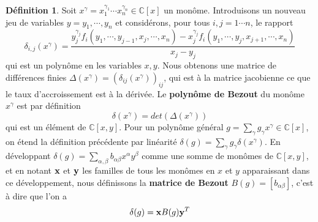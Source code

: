 \documentclass{article}
\theoremstyle{plain}%
\theoremstyle{definition}
\newtheorem{defn}{Définition}
\theoremstyle{remark}
\newcommand{\C}{\mathbb{C}}
\begin{document}
\begin{defn}
Soit $x^\gamma = x_1^{\gamma_1}\cdots x_n^{\gamma_n} \in \C[x]$ un monôme.
Introduisons un nouveau jeu de variables $y = y_1,\cdots, y_n$ et considérons, pour tous $i, j = 1\cdots n$, le rapport
\begin{equation}
\label{finite_diff}
\delta_{i,j}(x^\gamma) = \dfrac{y_j^{\gamma_j}f_i(y_1,\cdots, y_{j-1},x_j,\cdots,x_n) - x_j^{\gamma_j}f_i(y_1,\cdots,y_j,x_{j+1},\cdots,x_n)}{x_j - y_j}
\end{equation}
qui est un polynôme en les variables $x, y$. Nous obtenons une matrice de différences finies $\Delta(x^\gamma) = (\delta_{ij}(x^\gamma))_{ij}$, qui est à la matrice jacobienne ce que le taux d'accroissement est à la dérivée.
Le {\bf polynôme de Bezout} du monôme $x^\gamma$ est par définition
\begin{equation}
	\delta(x^\gamma) = det(\Delta(x^\gamma))
\end{equation}
qui est un élément de $\C[x, y]$. Pour un polynôme général $g = \sum_\gamma g_\gamma x^\gamma \in \C[x]$, on étend la définition précédente par linéarité $\delta(g) = \sum_\gamma g_\gamma \delta(x^\gamma)$.
En développant $\delta(g) = \sum_{\alpha,\beta} b_{\alpha\beta} x^\alpha y^\beta$ comme une somme de monômes de $\C[x, y]$, et en notant $\bold{x}$ et $\bold{y}$ les familles de tous les monômes en $x$ et $y$ apparaissant dans ce développement, nous définissons la {\bf matrice de Bezout} $B(g) = [b_{\alpha\beta}]$, c'est à dire que l'on a
\begin{equation}
	\delta(g) = \bold{x} B(g) \bold{y}^T
\end{equation}
\end{defn}
\end{document}
